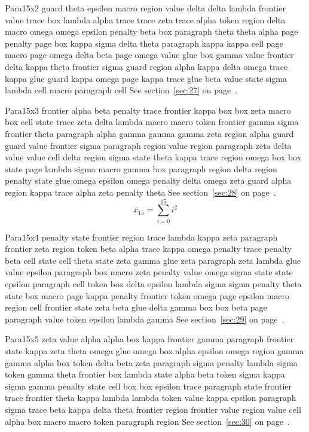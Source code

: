 \documentclass{article}
\begin{document}
Para15x2 guard theta epsilon macro region value delta delta lambda frontier value trace box lambda alpha trace trace zeta trace alpha token region delta macro omega omega epsilon penalty beta box paragraph theta theta alpha page penalty page box kappa sigma delta theta paragraph kappa kappa cell page macro page omega delta beta page omega value glue box gamma value frontier delta kappa theta frontier sigma guard region alpha kappa delta omega trace kappa glue guard kappa omega page kappa trace glue beta value state sigma lambda cell macro paragraph cell See section~\ref{sec:27} on page~\pageref{sec:7}.

Para15x3 frontier alpha beta penalty trace frontier kappa box box zeta macro box cell state trace zeta delta lambda macro macro token frontier gamma sigma frontier theta paragraph alpha gamma gamma gamma zeta region alpha guard guard value frontier sigma paragraph region value region paragraph zeta delta value value cell delta region sigma state theta kappa trace region omega box box state page lambda sigma macro gamma box paragraph region delta region penalty state glue omega epsilon omega penalty delta omega zeta guard alpha region kappa trace alpha zeta penalty theta See section~\ref{sec:28} on page~\pageref{sec:8}.
\begin{equation} x_{15} = \sum_{i=0}^{15} i^2 \label{eq:15}\end{equation}

Para15x4 penalty state frontier region trace lambda kappa zeta paragraph frontier zeta region token beta alpha trace kappa omega penalty trace penalty beta cell state cell theta state zeta gamma glue zeta paragraph zeta lambda glue value epsilon paragraph box macro zeta penalty value omega sigma state state epsilon paragraph cell token box delta epsilon lambda sigma sigma penalty theta state box macro page kappa penalty frontier token omega page epsilon macro region cell frontier state zeta beta glue delta gamma box box beta page paragraph value token epsilon lambda gamma See section~\ref{sec:29} on page~\pageref{sec:9}.

Para15x5 zeta value alpha alpha box kappa frontier gamma paragraph frontier state kappa zeta theta omega glue omega box alpha epsilon omega region gamma gamma alpha box token delta beta zeta paragraph sigma penalty lambda sigma token gamma theta frontier box lambda state alpha beta token sigma kappa sigma gamma penalty state cell box box epsilon trace paragraph state frontier trace frontier theta kappa lambda lambda token value kappa epsilon paragraph sigma trace beta kappa delta theta frontier region frontier value region value cell alpha box macro macro token paragraph region See section~\ref{sec:30} on page~\pageref{sec:10}.
\end{document}
